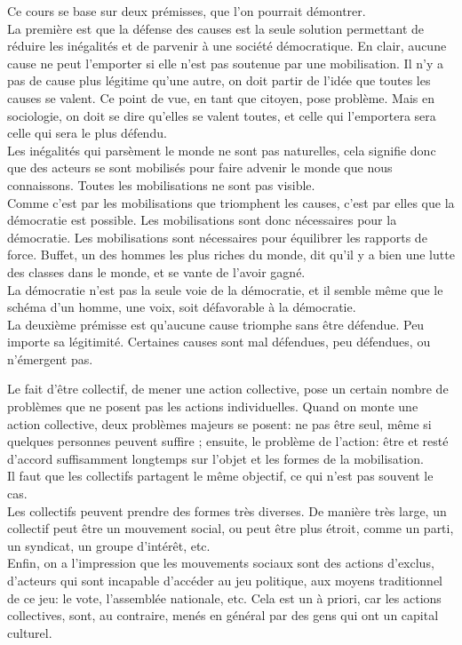 \documentclass[10pt, a4paper, openany]{book}
\begin{document}
Ce cours se base sur deux prémisses, que l'on pourrait démontrer. \\
La première est que la défense des causes est la seule solution permettant de réduire les inégalités et de parvenir à une société démocratique. En clair, aucune cause ne peut l'emporter si elle n'est pas soutenue par une mobilisation. Il n'y a pas de cause plus légitime qu'une autre, on doit partir de l'idée que toutes les causes se valent. Ce point de vue, en tant que citoyen, pose problème. Mais en sociologie, on doit se dire qu'elles se valent toutes, et celle qui l'emportera sera celle qui sera le plus défendu. \\
Les inégalités qui parsèment le monde ne sont pas naturelles, cela signifie donc que des acteurs se sont mobilisés pour faire advenir le monde que nous connaissons. Toutes les mobilisations ne sont pas visible. \\
Comme c'est par les mobilisations que triomphent les causes, c'est par elles que la démocratie est possible. Les mobilisations sont donc nécessaires pour la démocratie. Les mobilisations sont nécessaires pour équilibrer les rapports de force. Buffet, un des hommes les plus riches du monde, dit qu'il y a bien une lutte des classes dans le monde, et se vante de l'avoir gagné. \\
La démocratie n'est pas la seule voie de la démocratie, et il semble même que le schéma d'un homme, une voix, soit défavorable à la démocratie. \\
La deuxième prémisse est qu'aucune cause triomphe sans être défendue. Peu importe sa légitimité. Certaines causes sont mal défendues, peu défendues, ou n'émergent pas. 


Le fait d'être collectif, de mener une action collective, pose un certain nombre de problèmes que ne posent pas les actions individuelles. Quand on monte une action collective, deux problèmes majeurs se posent: ne pas être seul, même si quelques personnes peuvent suffire ; ensuite, le problème de l'action: être et resté d'accord suffisamment longtemps sur l'objet et les formes de la mobilisation. \\
Il faut que les collectifs partagent le même objectif, ce qui n'est pas souvent le cas. \\
Les collectifs peuvent prendre des formes très diverses. De manière très large, un collectif peut être un mouvement social, ou peut être plus étroit, comme un parti, un syndicat, un groupe d'intérêt, etc. \\
Enfin, on a l'impression que les mouvements sociaux sont des actions d'exclus, d'acteurs qui sont incapable d'accéder au jeu politique, aux moyens traditionnel de ce jeu: le vote, l'assemblée nationale, etc. Cela est un à priori, car les actions collectives, sont, au contraire, menés en général par des gens qui ont un capital culturel.
\end{document}
